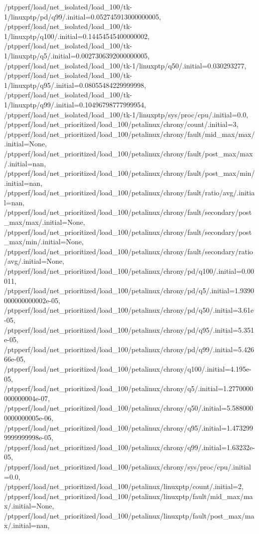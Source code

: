 {    /ptpperf/load/net_isolated/load_100/tk-1/linuxptp/pd/q99/.initial=0.052745913000000005,
    /ptpperf/load/net_isolated/load_100/tk-1/linuxptp/q100/.initial=0.14454545400000002,
    /ptpperf/load/net_isolated/load_100/tk-1/linuxptp/q5/.initial=0.0027306392000000005,
    /ptpperf/load/net_isolated/load_100/tk-1/linuxptp/q50/.initial=0.030293277,
    /ptpperf/load/net_isolated/load_100/tk-1/linuxptp/q95/.initial=0.08055484229999998,
    /ptpperf/load/net_isolated/load_100/tk-1/linuxptp/q99/.initial=0.10496798777999954,
    /ptpperf/load/net_isolated/load_100/tk-1/linuxptp/sys/proc/cpu/.initial=0.0,
    /ptpperf/load/net_prioritized/load_100/petalinux/chrony/count/.initial=3,
    /ptpperf/load/net_prioritized/load_100/petalinux/chrony/fault/mid_max/max/.initial=None,
    /ptpperf/load/net_prioritized/load_100/petalinux/chrony/fault/post_max/max/.initial=nan,
    /ptpperf/load/net_prioritized/load_100/petalinux/chrony/fault/post_max/min/.initial=nan,
    /ptpperf/load/net_prioritized/load_100/petalinux/chrony/fault/ratio/avg/.initial=nan,
    /ptpperf/load/net_prioritized/load_100/petalinux/chrony/fault/secondary/post_max/max/.initial=None,
    /ptpperf/load/net_prioritized/load_100/petalinux/chrony/fault/secondary/post_max/min/.initial=None,
    /ptpperf/load/net_prioritized/load_100/petalinux/chrony/fault/secondary/ratio/avg/.initial=None,
    /ptpperf/load/net_prioritized/load_100/petalinux/chrony/pd/q100/.initial=0.00011,
    /ptpperf/load/net_prioritized/load_100/petalinux/chrony/pd/q5/.initial=1.9390000000000002e-05,
    /ptpperf/load/net_prioritized/load_100/petalinux/chrony/pd/q50/.initial=3.61e-05,
    /ptpperf/load/net_prioritized/load_100/petalinux/chrony/pd/q95/.initial=5.351e-05,
    /ptpperf/load/net_prioritized/load_100/petalinux/chrony/pd/q99/.initial=5.42666e-05,
    /ptpperf/load/net_prioritized/load_100/petalinux/chrony/q100/.initial=4.195e-05,
    /ptpperf/load/net_prioritized/load_100/petalinux/chrony/q5/.initial=1.2770000000000004e-07,
    /ptpperf/load/net_prioritized/load_100/petalinux/chrony/q50/.initial=5.5880000000000005e-06,
    /ptpperf/load/net_prioritized/load_100/petalinux/chrony/q95/.initial=1.4732999999999998e-05,
    /ptpperf/load/net_prioritized/load_100/petalinux/chrony/q99/.initial=1.63232e-05,
    /ptpperf/load/net_prioritized/load_100/petalinux/chrony/sys/proc/cpu/.initial=0.0,
    /ptpperf/load/net_prioritized/load_100/petalinux/linuxptp/count/.initial=2,
    /ptpperf/load/net_prioritized/load_100/petalinux/linuxptp/fault/mid_max/max/.initial=None,
    /ptpperf/load/net_prioritized/load_100/petalinux/linuxptp/fault/post_max/max/.initial=nan,
}
